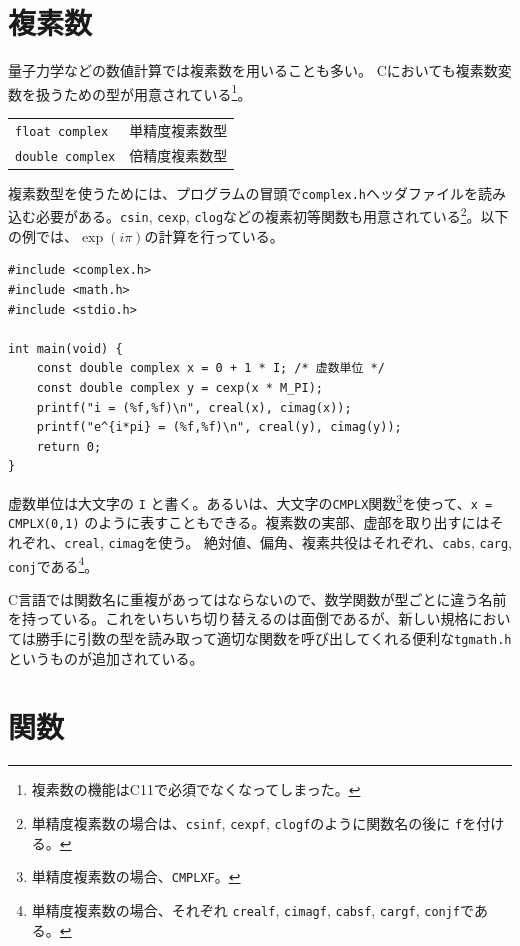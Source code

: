 \section{複素数}
\label{sec:C:complex}
量子力学などの数値計算では複素数を用いることも多い。
Cにおいても複素数変数を扱うための型が用意されている\footnote{複素数の機能はC11で必須でなくなってしまった。}。
\begin{table}[H]
    \centering
    \begin{tabular}{ll}
        \texttt{float complex}  & 単精度複素数型 \\
        \texttt{double complex} & 倍精度複素数型
    \end{tabular}
\end{table} \noindent
複素数型を使うためには、プログラムの冒頭で\texttt{complex.h}ヘッダファイルを読み込む必要がある。\texttt{csin}, \texttt{cexp}, \texttt{clog}などの複素初等関数も用意されている\footnote{単精度複素数の場合は、\texttt{csinf}, \texttt{cexpf}, \texttt{clogf}のように関数名の後に \texttt{f}を付ける。}。以下の例では、\(\exp(i\pi)\)の計算を行っている。
\begin{reidai}\label{ex:complex}
    \begin{verbatim}
#include <complex.h>
#include <math.h>
#include <stdio.h>

int main(void) {
    const double complex x = 0 + 1 * I; /* 虚数単位 */
    const double complex y = cexp(x * M_PI);
    printf("i = (%f,%f)\n", creal(x), cimag(x));
    printf("e^{i*pi} = (%f,%f)\n", creal(y), cimag(y));
    return 0;
}
\end{verbatim}
\end{reidai} \noindent
虚数単位は大文字の \texttt{I} と書く。あるいは、大文字の\texttt{CMPLX}関数\footnote{単精度複素数の場合、\texttt{CMPLXF}。}を使って、\texttt{x = CMPLX(0,1)} のように表すこともできる。複素数の実部、虚部を取り出すにはそれぞれ、\texttt{creal}, \texttt{cimag}を使う。
絶対値、偏角、複素共役はそれぞれ、\texttt{cabs}, \texttt{carg}, \texttt{conj}である\footnote{単精度複素数の場合、それぞれ \texttt{crealf}, \texttt{cimagf}, \texttt{cabsf}, \texttt{cargf}, \texttt{conjf}である。}。

C言語では関数名に重複があってはならないので、数学関数が型ごとに違う名前を持っている。これをいちいち切り替えるのは面倒であるが、新しい規格においては勝手に引数の型を読み取って適切な関数を呼び出してくれる便利な\texttt{tgmath.h}というものが追加されている。

\section{関数}
\label{sec:C:function}

